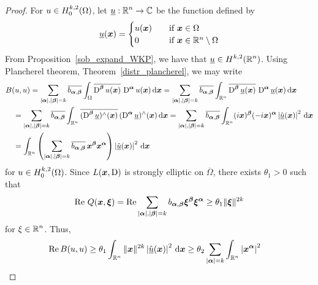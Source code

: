 \begin{proof}
For $\displaystyle u \in H^{k,2}_0(\Omega)$, let
$\displaystyle \underline{u}: \mathbb{R}^n \rightarrow \mathbb{C}$ be the function defined by
\[
\underline{u}({\bm{x}}) =
\begin{cases}
u({\bm{x}}) & \quad \text{if} \ {\bm{x}} \in \Omega \\
0 & \quad \text{if} \ {\bm{x}} \in \mathbb{R}^n \setminus \Omega
\end{cases}
\]
From Proposition~\ref{sob_expand_WKP}, we have that
$\displaystyle \underline{u}\in H^{k,2}(\mathbb{R}^n)$.
Using Plancherel theorem, Theorem~\ref{distr_plancherel}, we may write
\begin{align*}
&B(u,u) = \sum_{|{\bm{\alpha}}|,|{\bm{\beta}}|= k}
\overline{b_{{\bm{\alpha}},{\bm{\beta}}}} \int_{\Omega}
\overline{\operatorname{D}^{{\bm{\beta}}} u({\bm{x}})}\, \operatorname{D}^{{\bm{\alpha}}} u({\bm{x}})
\,\mathrm{d}{{\bm{x}}}
= \sum_{|{\bm{\alpha}}|,|{\bm{\beta}}|= k} \overline{b_{{\bm{\alpha}},{\bm{\beta}}}}
\int_{\mathbb{R}^n} \overline{\operatorname{D}^{{\bm{\beta}}} \underline{u}({\bm{x}})}\,
\operatorname{D}^{{\bm{\alpha}}} \underline{u}({\bm{x}}) \,\mathrm{d}{{\bm{x}}} \\
&\quad
= \sum_{|{\bm{\alpha}}|,|{\bm{\beta}}|= k} \overline{b_{{\bm{\alpha}},{\bm{\beta}}}}
\int_{\mathbb{R}^n} \overline{(\operatorname{D}^{{\bm{\beta}}} \underline{u})^\wedge({\bm{x}})}\,
(\operatorname{D}^{{\bm{\alpha}}} \underline{u})^\wedge({\bm{x}}) \,\mathrm{d}{{\bm{x}}}
= \sum_{|{\bm{\alpha}}|,|{\bm{\beta}}|= k} \overline{b_{{\bm{\alpha}},{\bm{\beta}}}}
\int_{\mathbb{R}^n} (i{\bm{x}})^{{\bm{\beta}}} (-i{\bm{x}})^{{\bm{\alpha}}}
\left| \hat{\underline{u}}({\bm{x}}) \right|^2 \,\mathrm{d}{{\bm{x}}} \\
&\quad = \int_{\mathbb{R}^n} \left( \sum_{|{\bm{\alpha}}|,|{\bm{\beta}}|= k}
\overline{b_{{\bm{\alpha}},{\bm{\beta}}}} \,{\bm{x}}^{{\bm{\beta}}}
{\bm{x}}^{{\bm{\alpha}}} \right)
\left| \hat{\underline{u}}({\bm{x}}) \right|^2 \,\mathrm{d}{{\bm{x}}}
\end{align*}
for $\displaystyle u \in H^{k,2}_0(\Omega)$.
Since $L({\bm{x}},\operatorname{D})$ is strongly elliptic on $\overline{\Omega}$,
there exists $\theta_1 >0$ such that
\begin{equation} \label{ell_garding2_theta}
\operatorname{Re}\, Q({\bm{x}}, {\bm{\xi}}) = \operatorname{Re}
\sum_{|{\bm{\alpha}}|,|{\bm{\beta}}|=k} b_{{\bm{\alpha}},{\bm{\beta}}}
{\bm{\xi}}^{{\bm{\beta}}} {\bm{\xi}}^{{\bm{\alpha}}} \geq \theta_1 \|{\bm{\xi}}\|^{2k}
\end{equation}
for $\displaystyle \xi \in \mathbb{R}^n$.  Thus,
\begin{align*}
\RE B(u,u) &\geq \theta_1 \int_{\RR^n} \| \VEC{x} \|^{2k}
\left| \hat{\underline{u}}(\VEC{x}) \right|^2 \dx{\VEC{x}}
\geq \theta_2 \sum_{|\VEC{\alpha}|=k} \int_{\RR^n}
\left| \VEC{x}^{\VEC{\alpha}} \right|^2 

\end{align*}
\end{proof}
